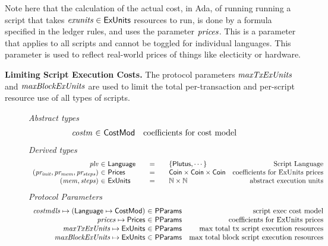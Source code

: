 Note here that the calculation of the actual cost, in Ada, of running
running a script that takes $\mathit{exunits} \in \mathsf{ExUnits}$ resources to run,
is done by a formula specified in the ledger rules, and uses the parameter
$\mathit{prices}$. This is a parameter that applies to all
scripts and cannot be toggled for individual languages. This parameter is
used to reflect real-world prices of things like electicity or hardware.

\textbf{Limiting Script Execution Costs.}
The protocol parameters $\mathit{maxTxExUnits}$ and $\mathit{maxBlockExUnits}$ are
used to limit the total per-transaction and per-script resource use of all
types of scripts.

\begin{figure*}[htb]
  \emph{Abstract types}
  \begin{equation*}
    \begin{array}{r@{~\in~}lr}
      \var{costm} & \CostMod & \text{coefficients for cost model} \\
    \end{array}
  \end{equation*}
  \emph{Derived types}
  \begin{equation*}
    \begin{array}{r@{~\in~}l@{\qquad=\qquad}lr}
      \var{plv}
      & \Language
      & \{\Plutus, \dotsb\}
      & \text{Script Language}
      \\
      \var{(pr_{init}, pr_{mem}, pr_{steps})}
      & \Prices
      & \Coin \times \Coin \times \Coin
      & \text {coefficients for ExUnits prices}
      \\
      \var{(mem, steps)}
      & \ExUnits
      & \N \times \N
      & \text{abstract execution units} \\
    \end{array}
  \end{equation*}
  \emph{Protocol Parameters}
  \begin{equation*}
      \begin{array}{r@{~\in~}lr}
        \var{costmdls} \mapsto (\Language \mapsto \CostMod) & \PParams & \text{script exec cost model}\\
        \var{prices} \mapsto \Prices & \PParams & \text{coefficients for ExUnits prices} \\
        \var{maxTxExUnits} \mapsto \ExUnits & \PParams & \text{max total tx script execution resources}\\
        \var{maxBlockExUnits} \mapsto \ExUnits & \PParams & \text{max total block script execution resources}\\

\end{array}
\end{equation*}
\end{figure*}
